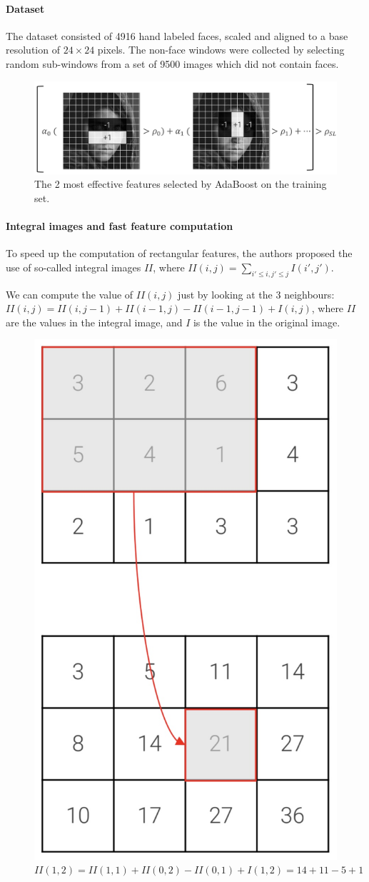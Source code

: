 \documentclass{article}
\begin{document}
\paragraph{Dataset}
The dataset consisted of 4916 hand labeled faces, scaled and aligned to a base resolution of $24 \times 24$ pixels.
The non-face windows were collected by selecting random sub-windows from a set of 9500 images which did not contain faces.

\begin{figure}[htbp]
  \centering
  \includegraphics[width=0.6\linewidth]{./img/adaboost.png}
  \caption{The 2 most effective features selected by AdaBoost on the training set.}
\end{figure}

\paragraph{Integral images and fast feature computation}
To speed up the computation of rectangular features, the authors proposed the use of so-called integral images $II$, where $II(i,j) = \sum_{i' \leq i, j' \leq j} I(i', j')$.

We can compute the value of $II(i,j)$ just by looking at the 3 neighbours: $II(i,j) = II(i, j-1) + II(i-1, j) - II(i-1, j-1) + I(i,j)$, where $II$ are the values in the integral image, and $I$ is the value in the original image.

\begin{figure}[htbp]
  \centering
  \includegraphics[width=0.6\linewidth]{./img/integral_images.jpg}
  \caption{$II(1,2) = II(1,1) + II(0,2) - II(0,1) + I(1,2) = 14 + 11 - 5 + 1$}
\end{figure}
\end{document}
